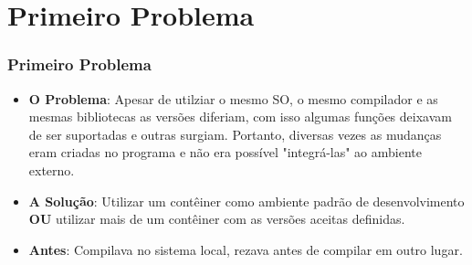 \documentclass[10pt]{beamer}
\theoremstyle{remark}
\theoremstyle{definition}
\begin{document}
\section{Primeiro Problema}
\begin{frame}[allowframebreaks]
\frametitle{Primeiro Problema}
	\begin{itemize}
	
		\item \textbf{O Problema}: Apesar de utilziar o mesmo SO, o mesmo compilador e as mesmas bibliotecas as versões diferiam, com isso algumas funções deixavam de ser suportadas e outras surgiam. Portanto, diversas vezes as mudanças eram criadas no programa e não era possível "integrá-las" ao ambiente externo. 
		
		\item \textbf{A Solução}: Utilizar um contêiner como ambiente padrão de desenvolvimento \textbf{OU} utilizar mais de um contêiner com as versões aceitas definidas.

		\item \textbf{Antes}: Compilava no sistema local, rezava antes de compilar em outro lugar.
		
	\end{itemize}
\end{frame}
	
\end{document}
